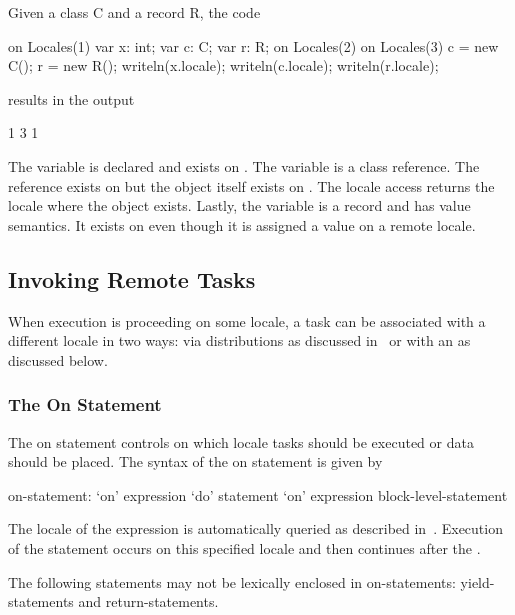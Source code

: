 \begin{example}
Given a class C and a record R, the code
\begin{chapel}
on Locales(1) {
  var x: int;
  var c: C;
  var r: R;
  on Locales(2) {
    on Locales(3) {
      c = new C();
      r = new R();
    }
    writeln(x.locale);
    writeln(c.locale);
    writeln(r.locale);
  }
}
\end{chapel}
results in the output
\begin{chapel}
1
3
1
\end{chapel}
The variable  is declared and exists on .
The variable  is a class reference.  The reference exists
on  but the object itself exists
on .  The locale access returns the locale where the
object exists.  Lastly, the variable  is a record and has
value semantics.  It exists on  even though it is
assigned a value on a remote locale.
\end{example}

\subsection{Invoking Remote Tasks}
\label{Specifying_Locales}

When execution is proceeding on some locale, a task can be associated
with a different locale in two ways: via distributions as discussed
in~ or with an  as discussed
below.

\subsubsection{The On Statement}
\label{On}

The on statement controls on which locale tasks should be executed or
data should be placed.  The syntax of the on statement is given by
\begin{syntax}
on-statement:
  `on' expression `do' statement
  `on' expression block-level-statement
\end{syntax}
The locale of the expression is automatically queried as described
in~.  Execution of the
statement occurs on this specified locale and then continues after
the .

The following statements may not be lexically enclosed in
on-statements: yield-statements and return-statements.


